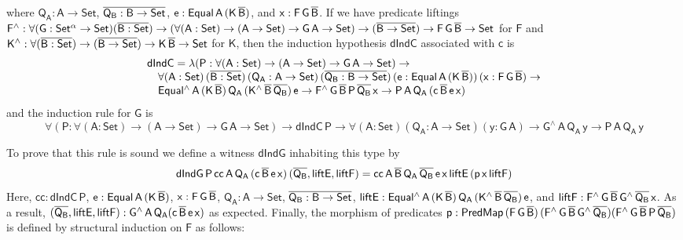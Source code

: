 \documentclass[9pt]{entcs}
\begin{document}
\noindent
where $\mathsf{Q_A : A \to Set}$, $\overline{\mathsf{Q_B : B \to Set}}$,
$\mathsf{e : Equal\,A\,(K\,\overline{B})}$, and $\mathsf{x : F\,G\,\overline{B}}$.
If we have predicate liftings $\mathsf{F^{\wedge}} : \mathsf{\forall
  (G : Set^{\alpha} \to Set) (\overline{B : Set}) \to (\forall (A : Set) \to
  (A \to Set) \to G\,A \to Set) \to (\overline{B \to Set}) \to F\,G\,\overline{B}
  \to Set}$ for $\mathsf{F}$ and $\mathsf{K^{\wedge}} :
\mathsf{\forall (\overline{B : Set}) \to (\overline{B \to Set}) \to K\,\overline{B} \to
  Set}$
for $\mathsf{K}$, then the induction hypothesis $\mathsf{dIndC}$
associated with $\mathsf{c}$ is
\[\begin{array}{l}
\mathsf{dIndC = \lambda (P : \forall (A : Set) \to (A \to Set) \to
  G\,A \to Set) \to}\\
\quad \mathsf{\forall (A : Set)\, (\overline{B : Set})\, (Q_A : A \to Set)\,
  (\overline{Q_B : B \to Set})\, (e : Equal\,A\,(K\,\overline{B}))\, (x :
  F\,G\,\overline{B}) \to} \\ 
\quad \mathsf{
  Equal^{\wedge}\,A\,(K\,\overline{B})\,Q_A\,(K^{\wedge}\,\overline{B}\,\overline{Q_B})\,e
  \to F^{\wedge}\,G\,\overline{B}\,P\,\overline{Q_B}\,x \to
  P\,A\,Q_A\,(c\,\overline{B}\,e\,x)} 
\end{array}\]
and the induction rule for $\mathsf{G}$ is
\[
\mathsf{\forall (P : \forall (A : Set) \to (A \to Set) \to G\,A \to
  Set) \to dIndC\,P \to \forall (A : Set)(Q_A : A \to Set)(y : G\,A)
\to G^{\wedge}\,A\,Q_A\,y \to P\,A\,Q_A\,y} \]

To prove that this rule is sound we define a witness
$\mathsf{dIndG}$ inhabiting this type by
\[\mathsf{dIndG\,P\,cc\,A\,Q_A\,(c\,\overline{B}\,e\,x)\,(\overline{Q_B}, liftE, liftF)
= cc\,A\,\overline{B}\,Q_A\,\overline{Q_B}\,e\,x\,liftE\,(p\,x\,liftF)}\] Here,
$\mathsf{cc : dIndC\,P}$, $\mathsf{e : Equal\,A\,(K\,\overline{B})}$,
$\mathsf{x : F\,G\,\overline{B}}$, $\mathsf{Q_A : A \to Set}$,
$\overline{\mathsf{Q_B : B \to Set}}$, $\mathsf{liftE :
  Equal^{\wedge}\,A\,(K\,\overline{B})\,Q_A\,
  (K^{\wedge}\,\overline{B}\,\overline{Q_B})\,e}$, and $\mathsf{liftF :
  F^{\wedge}\,G\,\overline{B}\,G^{\wedge}\,{\overline{Q_B}}\,x}$. As a result,
$\mathsf{(\overline{Q_B}, liftE, liftF) : G^{\wedge}\,A\,Q_A (c\,\overline{B}\,
  e\,x)}$ as expected.  Finally, the morphism of predicates $\mathsf{p
  :
  PredMap\,(F\,G\,\overline{B})\,(F^{\wedge}\,G\,\overline{B}\,G^{\wedge}\,\overline{Q_B})
  (F^{\wedge}\,G\,\overline{B}\,P\,\overline{Q_B})}$ is defined by structural
induction on $\mathsf{F}$ as follows:
\end{document}
